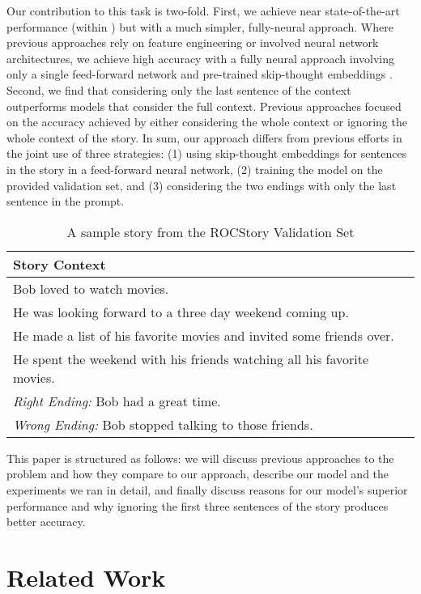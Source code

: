 \documentclass[11pt,a4paper]{article}
\begin{document}
Our contribution to this task is two-fold. 
First, we achieve near state-of-the-art performance (within ) but with a much simpler, fully-neural approach.
Where previous approaches rely on feature engineering or involved neural network architectures, we achieve high accuracy with a fully neural approach involving only a single feed-forward network and pre-trained skip-thought embeddings \citep{kiros2015skip}.
Second, we find that considering only the last sentence of the context outperforms models that consider the full context. Previous approaches focused on the accuracy achieved by either considering the whole context or ignoring the whole context of the story.
In sum, our approach differs from previous efforts in the joint use of three strategies: (1) using skip-thought embeddings \citep{kiros2015skip} for sentences in the story in a feed-forward neural network, (2) training the model on the provided validation set, and (3) considering the two endings with only the last sentence in the prompt. 


\begin{table}[t]
\small
\begin{center}
\begin{tabular}{|p{6 cm}|}
\hline
{\bf Story Context} \\
\hline
Bob loved to watch movies. \\
He was looking forward to a three day weekend coming up. \\
He made a list of his favorite movies and invited some friends over. \\
He spent the weekend with his friends watching all his favorite movies. \\
\hline
\emph{Right Ending:} Bob had a great time. \\
\emph{Wrong Ending:} Bob stopped talking to those friends. \\
\hline
\end{tabular}
\end{center}
\caption{\label{sample} A sample story from the ROCStory Validation Set }
\end{table}

This paper is structured as follows: we will discuss previous approaches to the problem and how they compare to our approach, describe our model and the experiments we ran in detail, and finally discuss reasons for our model's superior performance and why ignoring the first three sentences of the story produces better accuracy.

\section{Related Work}
\end{document}
